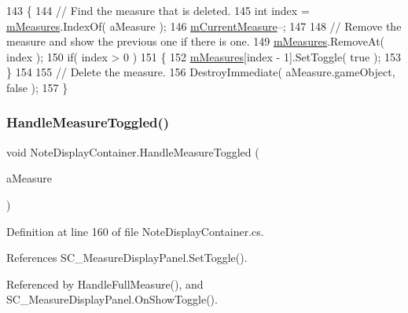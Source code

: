\begin{DoxyCode}
143     \{
144         \textcolor{comment}{// Find the measure that is deleted.}
145         \textcolor{keywordtype}{int} index = \hyperlink{class_note_display_container_ae5ca6e7ea4ab2baaab9ff649bf25c0d6}{mMeasures}.IndexOf( aMeasure );
146         \hyperlink{class_note_display_container_a79a97c9e0f45ba4242b66d6ec317d020}{mCurrentMeasure}--;
147 
148         \textcolor{comment}{// Remove the measure and show the previous one if there is one. }
149         \hyperlink{class_note_display_container_ae5ca6e7ea4ab2baaab9ff649bf25c0d6}{mMeasures}.RemoveAt( index );
150         \textcolor{keywordflow}{if}( index > 0 )
151         \{
152             \hyperlink{class_note_display_container_ae5ca6e7ea4ab2baaab9ff649bf25c0d6}{mMeasures}[index - 1].SetToggle( \textcolor{keyword}{true} );
153         \}
154 
155         \textcolor{comment}{// Delete the measure.}
156         DestroyImmediate( aMeasure.gameObject, \textcolor{keyword}{false} );
157     \}
\end{DoxyCode}
\mbox{\label{class_note_display_container_a54dc5bb2f6850037473ec82efe632716}} 
\subsubsection{\texorpdfstring{Handle\+Measure\+Toggled()}{HandleMeasureToggled()}}
{\footnotesize\ttfamily void Note\+Display\+Container.\+Handle\+Measure\+Toggled (\begin{DoxyParamCaption}\item[{\hyperlink{class_s_c___measure_display_panel}{S\+C\+\_\+\+Measure\+Display\+Panel}}]{a\+Measure }\end{DoxyParamCaption})}



Definition at line 160 of file Note\+Display\+Container.\+cs.



References S\+C\+\_\+\+Measure\+Display\+Panel.\+Set\+Toggle().



Referenced by Handle\+Full\+Measure(), and S\+C\+\_\+\+Measure\+Display\+Panel.\+On\+Show\+Toggle().


